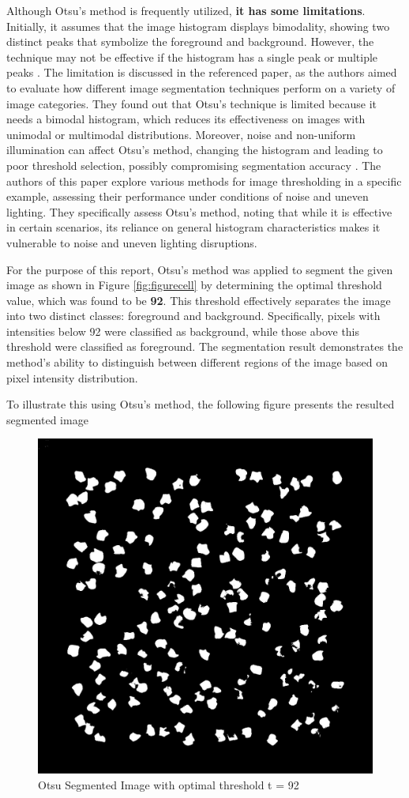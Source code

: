 \documentclass[%
	a4paper, %
	12pt, %
	english, %
	bibtotoc %
]{scrartcl}
\begin{document}
Although Otsu's method is frequently utilized, \textbf{it has some limitations}. Initially, it assumes that the image histogram displays bimodality, showing two distinct peaks that symbolize the foreground and background. However, the technique may not be effective if the histogram has a single peak or multiple peaks \cite{sezgin_image_techniques}. The limitation is discussed in the referenced paper, as the authors aimed to evaluate how different image segmentation techniques perform on a variety of image categories. They found out that Otsu's technique is limited because it needs a bimodal histogram, which reduces its effectiveness on images with unimodal or multimodal distributions. Moreover, noise and non-uniform illumination can affect Otsu's method, changing the histogram and leading to poor threshold selection, possibly compromising segmentation accuracy \cite{huang_minimizing_fuzziness}. The authors of this paper explore various methods for image thresholding in a specific example, assessing their performance under conditions of noise and uneven lighting. They specifically assess Otsu's method, noting that while it is effective in certain scenarios, its reliance on general histogram characteristics makes it vulnerable to noise and uneven lighting disruptions.

For the purpose of this report, Otsu's method was applied to segment the given image as shown in Figure \ref{fig:figurecell} by determining the optimal threshold value, which was found to be \textbf{92}. This threshold effectively separates the image into two distinct classes: foreground and background. Specifically, pixels with intensities below 92 were classified as background, while those above this threshold were classified as foreground. The segmentation result demonstrates the method's ability to distinguish between different regions of the image based on pixel intensity distribution.

To illustrate this using Otsu's method, the following figure presents the resulted segmented image

\begin{figure}[h]
    \centering
    \includegraphics[width=0.3\linewidth]{otsu_segmentation.jpg}
    \caption{Otsu Segmented Image with optimal threshold t = 92}
    \label{fig:otsu_segmentation}
\end{figure}
\end{document}
